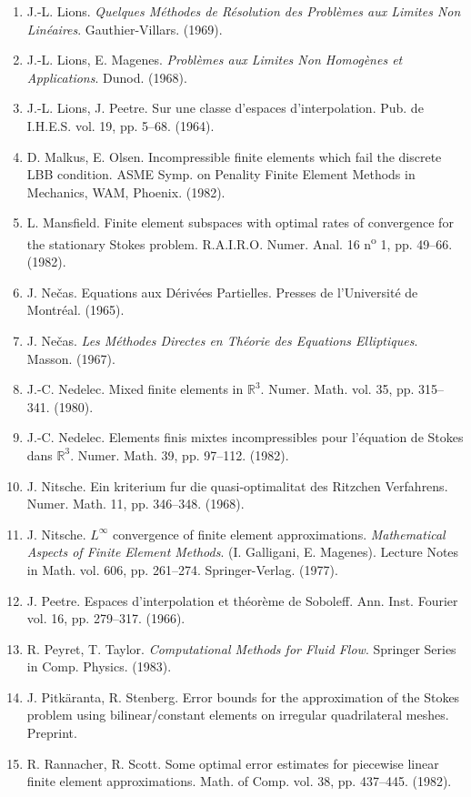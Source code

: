 \begin{enumerate}
\item J.-L. Lions. \textit{Quelques Méthodes de Résolution des Problèmes aux Limites Non Linéaires}. Gauthier-Villars. (1969).
\item J.-L. Lions, E. Magenes. \textit{Problèmes aux Limites Non Homogènes et Applications}. Dunod. (1968).
\item J.-L. Lions, J. Peetre. Sur une classe d'espaces d'interpolation. Pub. de I.H.E.S. vol. 19, pp. 5--68. (1964).
\item D. Malkus, E. Olsen. Incompressible finite elements which fail the discrete LBB condition. ASME Symp. on Penality Finite Element Methods in Mechanics, WAM, Phoenix. (1982).
\item L. Mansfield. Finite element subspaces with optimal rates of convergence for the stationary Stokes problem. R.A.I.R.O. Numer. Anal. 16 n\textsuperscript{o} 1, pp. 49--66. (1982).
\item J. Nečas. Equations aux Dérivées Partielles. Presses de l'Université de Montréal. (1965).
\item J. Nečas. \textit{Les Méthodes Directes en Théorie des Equations Elliptiques}. Masson. (1967).
\item J.-C. Nedelec. Mixed finite elements in $\mathbb{R}^{3}$. Numer. Math. vol. 35, pp. 315--341. (1980).
\item J.-C. Nedelec. Elements finis mixtes incompressibles pour l'équation de Stokes dans $\mathbb{R}^{3}$. Numer. Math. 39, pp. 97--112. (1982).
\item J. Nitsche. Ein kriterium fur die quasi-optimalitat des Ritzchen Verfahrens. Numer. Math. 11, pp. 346--348. (1968).
\item J. Nitsche. $L^{\infty}$ convergence of finite element approximations. \textit{Mathematical Aspects of Finite Element Methods}. (I. Galligani, E. Magenes). Lecture Notes in Math. vol. 606, pp. 261--274. Springer-Verlag. (1977).
\item J. Peetre. Espaces d'interpolation et théorème de Soboleff. Ann. Inst. Fourier vol. 16, pp. 279--317. (1966).
\item R. Peyret, T. Taylor. \textit{Computational Methods for Fluid Flow}. Springer Series in Comp. Physics. (1983).
\item J. Pitkäranta, R. Stenberg. Error bounds for the approximation of the Stokes problem using bilinear/constant elements on irregular quadrilateral meshes. Preprint.
\item R. Rannacher, R. Scott. Some optimal error estimates for piecewise linear finite element approximations. Math. of Comp. vol. 38, pp. 437--445. (1982).

\end{enumerate}
